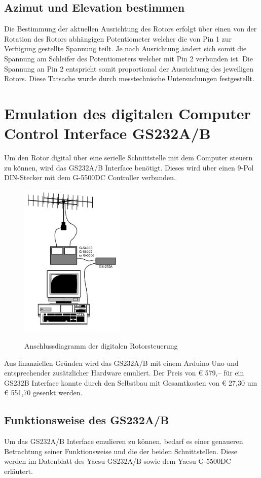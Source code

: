 \subsection {Azimut und Elevation bestimmen}
Die Bestimmung der aktuellen Ausrichtung des Rotors erfolgt über einen von der Rotation des Rotors abhängigen Potentiometer welcher die von Pin 1 zur Verfügung gestellte Spannung teilt. Je nach Ausrichtung ändert sich somit die Spannung am Schleifer des Potentiometers welcher mit Pin 2 verbunden ist. Die Spannung an Pin 2 entspricht somit proportional der Ausrichtung des jeweiligen Rotors. Diese Tatsache wurde durch messtechnische Untersuchungen festgestellt.

\section{Emulation des digitalen Computer Control Interface GS232A/B}
Um den Rotor digital über eine serielle Schnittstelle mit dem Computer steuern zu können, wird das GS232A/B Interface benötigt. Dieses wird über einen 9-Pol DIN-Stecker mit dem G-5500DC Controller verbunden. 
\begin{figure}[H]
	\cite{noauthor_yaesu_nodate}
	\centering
	\includegraphics[width=5cm]{../ref/GS232_Prinzipschaltbild.png}
	\label{fig:Rotor_Prinzipschaltbild}
	\caption{Anschlussdiagramm der digitalen Rotorsteuerung}
\end{figure}
Aus finanziellen Gründen wird das GS232A/B mit einem Arduino Uno und entsprechender zusätzlicher Hardware emuliert. Der Preis von € 579,-- für ein GS232B Interface \cite{noauthor_yaesuinterface_nodate} konnte durch den Selbstbau mit Gesamtkosten von € 27,30 um € 551,70 gesenkt werden.

\subsection{Funktionsweise des GS232A/B}
Um das GS232A/B Interface emulieren zu können, bedarf es einer genaueren Betrachtung seiner Funktionsweise und die der beiden Schnittstellen. Diese werden im Datenblatt des Yaesu GS232A/B sowie dem Yaesu G-5500DC \cite{noauthor_yaesu_nodate} erläutert.

